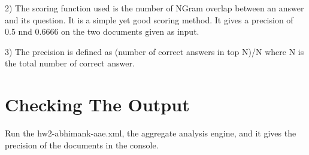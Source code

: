 \documentclass{article}
\begin{document}
2) The scoring function used is the number of NGram overlap between an answer
and its question. It is a simple yet good scoring method. It gives a precision
of 0.5 nnd 0.6666 on the two documents given as input.

3) The precision is defined as (number of correct answers in top N)/N where N is
the total number of correct answer.

\section{Checking The Output}
Run the hw2-abhimank-aae.xml, the aggregate analysis engine, and it gives the 
precision of the documents in the console.  
%
%
\end{document}

